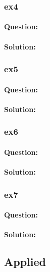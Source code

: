 \documentclass[a4paper,12pt,titlepage]{article} %
\begin{document}
\subsubsection{ex4}
\paragraph{Question:}

\paragraph{Solution:}

\subsubsection{ex5}
\paragraph{Question:}

\paragraph{Solution:}

\subsubsection{ex6}
	
\paragraph{Question:}

\paragraph{Solution:}

\subsubsection{ex7}
\paragraph{Question:}

\paragraph{Solution:}


\subsection{Applied}
\end{document}
